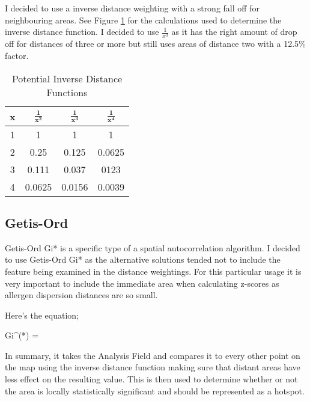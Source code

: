 I decided to use a inverse distance weighting with a strong fall off for neighbouring areas. See Figure \ref{table:dist} for the calculations used to determine the inverse distance function. I decided to use $\frac{1}{x^3}$ as it has the right amount of drop off for distances of three or more but still uses areas of distance two with a 12.5\% factor.\\ 

\begin{table}[H]
\begin{center}
\begin{tabular}{|c|c|c|c|}\hline\hline
x&$\mathbf{\frac{1}{x^2}}$&$\mathbf{\frac{1}{x^3}}$&$\mathbf{\frac{1}{x^4}}$\\\hline
1&1&1&1\\
2&0.25&0.125&0.0625\\
3&0.111&0.037&0123\\
4&0.0625&0.0156&0.0039\\\hline\hline
\end{tabular}
\caption{Potential Inverse Distance Functions}
\label{table:dist}
\end{center}
\end{table}


\subsection{Getis-Ord}

Getis-Ord Gi* is a specific type of a spatial autocorrelation algorithm. I decided to use Getis-Ord Gi* as the alternative solutions tended not to include the feature being examined in the distance weightings. For this particular usage it is very important to include the immediate area when calculating z-scores as allergen dispersion distances are so small.

Here's the equation;

\begin{myequation}%
Gi^(*) = 
\end{myequation}

In summary, it takes the Analysis Field and compares it to every other point on the map using the inverse distance function making sure that distant areas have less effect on the resulting value. This is then used to determine whether or not the area is locally statistically significant and should be represented as a hotspot.

